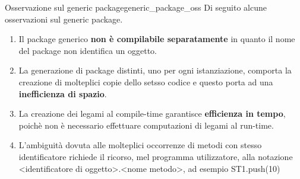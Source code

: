 \documentclass[12pt]{report}
\newcommand{\nmu}{}
\begin{document}
		\begin{note}{\nmu Osservazione sul generic package}{generic_package_oss}
			Di seguito alcune osservazioni sul generic package.
			\begin{enumerate}
				\item Il package generico \textbf{non è compilabile separatamente} in quanto il nome del package non identifica un oggetto.
				\item La generazione di package distinti, uno per ogni istanziazione, comporta la creazione di molteplici copie dello setsso codice e questo porta ad una \textbf{inefficienza di spazio}.
				\item La creazione dei legami al compile-time garantisce \textbf{efficienza in tempo}, poichè non è necessario effettuare computazioni di legami al run-time.
				\item L'ambiguità dovuta alle molteplici occorrenze di metodi con stesso identificatore richiede il ricorso, mel programma utilizzatore, alla notazione <identificatore di oggetto>.<nome metodo>, ad esempio ST1.push(10)
			\end{enumerate}
		\end{note}
\end{document}
